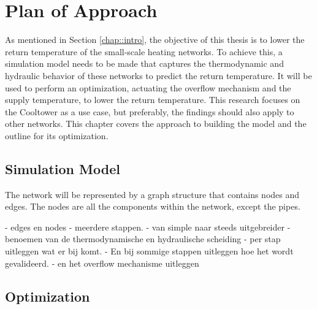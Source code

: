 \chapter{Plan of Approach}\label{chap::PoA}
As mentioned in Section \ref{chap::intro}, the objective of this thesis is to lower the return temperature of the small-scale heating networks. To achieve this, a simulation model needs to be made that captures the thermodynamic and hydraulic behavior of these networks to predict the return temperature. It will be used to perform an optimization, actuating the overflow mechanism and the supply temperature, to lower the return temperature. This research focuses on the Cooltower as a use case, but preferably, the findings should also apply to other networks. This chapter covers the approach to building the model and the outline for its optimization.

\section{Simulation Model}
The network will be represented by a graph structure that contains nodes and edges. The nodes are all the components within the network, except the pipes. 

- edges en nodes
- meerdere stappen.
- van simple naar steeds uitgebreider
- benoemen van de thermodynamische en hydraulische scheiding 
- per stap uitleggen wat er bij komt.
- En bij sommige stappen uitleggen hoe het wordt gevalideerd.
- en het overflow mechanisme uitleggen

\section{Optimization}
